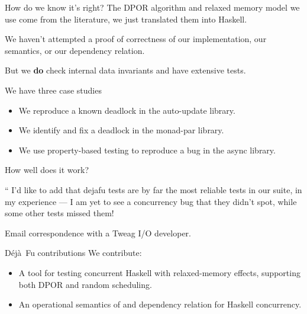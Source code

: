 \documentclass{beamer}
\newcommand{\dejafu}{D\'{e}j\`{a}~Fu}
\begin{document}
\begin{frame}{How do we know it's right?}
  The DPOR algorithm and relaxed memory model we use come from the
  literature, we just translated them into Haskell.

  We haven't attempted a proof of correctness of our implementation,
  our semantics, or our dependency relation.

  But we \textbf{do} check internal data invariants and have extensive
  tests.
\end{frame}

\begin{frame}{We have three case studies}
  \begin{itemize}
  \item We reproduce a known deadlock in the auto-update library.
  \item We identify and fix a deadlock in the monad-par library.
  \item We use property-based testing to reproduce a bug in the async
    library.
  \end{itemize}
\end{frame}

\begin{frame}{How well does it work?}
  \begin{displayquote}
    \hspace{-0.7cm} {\Huge ``}
    I'd like to add that dejafu tests are by far the most reliable
    tests in our suite, in my experience --- I am yet to see a
    concurrency bug that they didn’t spot, while some other tests
    missed them!
    \vspace{1em}

    \noindent\normalfont\footnotesize
    Email correspondence with a Tweag I/O developer.
  \end{displayquote}
\end{frame}

\begin{frame}{\dejafu{} contributions}
  We contribute:

  \begin{itemize}
  \item A tool for testing concurrent Haskell with relaxed-memory
    effects, supporting both DPOR and random scheduling.

  \item An operational semantics of and dependency relation for
    Haskell concurrency.
  \end{itemize}
\end{frame}
\end{document}
